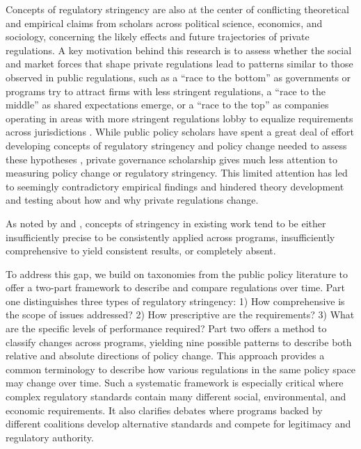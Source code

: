 \documentclass[
      12pt,
            Review ]{article}
\begin{document}
Concepts of regulatory stringency are also at the center of conflicting theoretical and empirical claims from scholars across political science, economics, and sociology, concerning the likely effects and future trajectories of private regulations. A key motivation behind this research is to assess whether the social and market forces that shape private regulations lead to patterns similar to those observed in public regulations, such as a ``race to the bottom'' as governments or programs try to attract firms with less stringent regulations, a ``race to the middle'' as shared expectations emerge, or a ``race to the top'' as companies operating in areas with more stringent regulations lobby to equalize requirements across jurisdictions \citep{Berger1996, Vogel1995}. While public policy scholars have spent a great deal of effort developing concepts of regulatory stringency and policy change needed to assess these hypotheses \citep{Green-Pedersen2007, Hall1993, Howlett2014}, private governance scholarship gives much less attention to measuring policy change or regulatory stringency. This limited attention has led to seemingly contradictory empirical findings and hindered theory development and testing about how and why private regulations change.

As noted by \citet{Brunel2016} and \citet{Howlett2007}, concepts of stringency in existing work tend to be either insufficiently precise to be consistently applied across programs, insufficiently comprehensive to yield consistent results, or completely absent.

To address this gap, we build on taxonomies from the public policy literature to offer a two-part framework to describe and compare regulations over time. Part one distinguishes three types of regulatory stringency: 1) How comprehensive is the scope of issues addressed? 2) How prescriptive are the requirements? 3) What are the specific levels of performance required? Part two offers a method to classify changes across programs, yielding nine possible patterns to describe both relative and absolute directions of policy change. This approach provides a common terminology to describe how various regulations in the same policy space may change over time. Such a systematic framework is especially critical where complex regulatory standards contain many different social, environmental, and economic requirements. It also clarifies debates where programs backed by different coalitions develop alternative standards and compete for legitimacy and regulatory authority.
\end{document}
